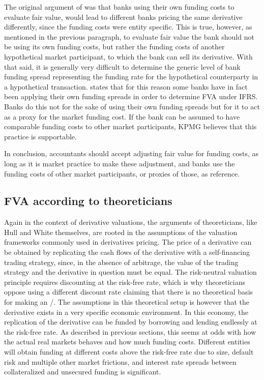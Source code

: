 \documentclass[main.tex]{subfiles}
\begin{document}
            The original argument of \textcite{HullWhiteFVA} was that banks using their own funding costs to evaluate fair value,
            would lead to different banks pricing the same derivative differently,
            since the funding costs were entity specific.
            This is true, however, as mentioned in the previous paragraph,
            to evaluate fair value the bank should not be using its own funding costs, 
            but rather the funding costs of another hypothetical market participant, 
            to which the bank can sell its derivative.
            With that said, it is generally very difficult to determine the generic level of bank funding spread
            representing the funding rate for the hypothetical counterparty in a hypothetical transaction.
            \textcite[Proposition 4]{KPMGFVA} states that for this reason 
            some banks have in fact been applying their own funding spreads in order to determine FVA under IFRS. 
            Banks do this not for the sake of using their own funding spreads
            but for it to act as a proxy for the market funding cost.
            If the bank can be assumed to have comparable funding costs to other market participants,
            KPMG believes that this practice is supportable.

            In conclusion, accountants should accept adjusting fair value for funding costs,
            as long as it is market practice to make these adjustment,
            and banks use the funding costs of other market participants, or proxies of those, as reference.

        \subsection{FVA according to theoreticians}
            Again in the context of derivative valuations, 
            the arguments of theoreticians, like Hull and White themselves, 
            are rooted in the assumptions of the valuation frameworks commonly used in derivatives pricing.
            The price of a derivative can be obtained by replicating the cash flows of the derivative 
            with a self-financing trading strategy, since, in the absence of arbitrage, 
            the value of the trading strategy and the derivative in question must be equal.
            The risk-neutral valuation principle requires discounting at the risk-free rate,
            which is why theoreticians oppose using a different discount rate
            claiming that there is no theoretical basis for making an \FVA/.
            The assumptions in this theoretical setup is however 
            that the derivative exists in a very specific economic environment. 
            In this economy, the replication of the derivative
            can be funded by borrowing and lending endlessly at the risk-free rate.
            As described in previous sections,
            this seems at odds with how the actual real markets behaves and how much funding costs.
            Different entities will obtain funding at different costs above the risk-free rate due to size,
            default risk and multiple other market frictions,
            and interest rate spreads between collateralized and unsecured funding is significant.
\end{document}
